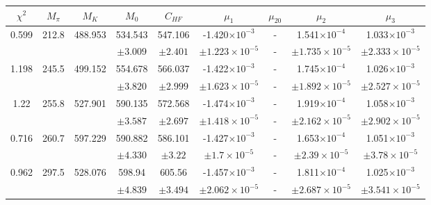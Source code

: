 \documentclass[10pt,a4paper]{article}
\begin{document}
										\begin{table}[h!]
											\begin{tabular}{ccccccccc}
												$\chi^2$ & $M_\pi$ & $M_K$ & $M_0$ & $C_{HF}$ & $\mu_1$ & $\mu_{20}$ & $\mu_2$ & $\mu_3$ \\
												\hline 0.599 & 212.8 & 488.953 & 534.543 & 547.106 & -1.420$\times10^{-3}$ & - & 1.541$\times10^{-4}$ & 1.033$\times10^{-3}$ \\
												&&& $\pm3.009$ & $\pm2.401$ & $\pm1.223\times10^{-5}$ & - & $\pm1.735\times10^{-5}$ & $\pm2.333\times10^{-5}$ \\
												\hline 1.198 & 245.5 & 499.152 & 554.678 & 566.037 & -1.422$\times10^{-3}$ & - & 1.745$\times10^{-4}$ & 1.026$\times10^{-3}$ \\
												&&& $\pm3.820$ & $\pm2.999$ & $\pm1.623\times10^{-5}$ & - & $\pm1.892\times10^{-5}$ & $\pm2.527\times10^{-5}$ \\
												\hline 1.22 & 255.8 & 527.901 & 590.135 & 572.568 & -1.474$\times10^{-3}$ & - & 1.919$\times10^{-4}$ & 1.058$\times10^{-3}$ \\
												&&& $\pm3.587$ & $\pm2.697$ & $\pm1.418\times10^{-5}$  & - &  $\pm2.162\times10^{-5}$ & $\pm2.902\times10^{-5}$\\
												\hline 0.716 & 260.7 & 597.229 & 590.882 & 586.101 & -1.427$\times10^{-3}$ &  - & 1.653$\times10^{-4}$ & 1.051$\times10^{-3}$ \\
												&&& $\pm4.330$ & $\pm3.22$ & $\pm1.7\times10^{-5}$& - & $\pm2.39\times10^{-5}$& $\pm3.78\times10^{-5}$ \\
												\hline 0.962 & 297.5 & 528.076 & 598.94 & 605.56 & -1.457$\times10^{-3}$ & - & 1.811$\times10^{-4}$ & 1.025$\times10^{-3}$  \\
												&&& $\pm4.839$& $\pm3.494$& $\pm2.062\times10^{-5}$& - & $\pm2.687\times10^{-5}$ & $\pm3.541\times10^{-5}$ \\
												\hline
											\end{tabular}
										\end{table}
										
					
					
\end{document}
